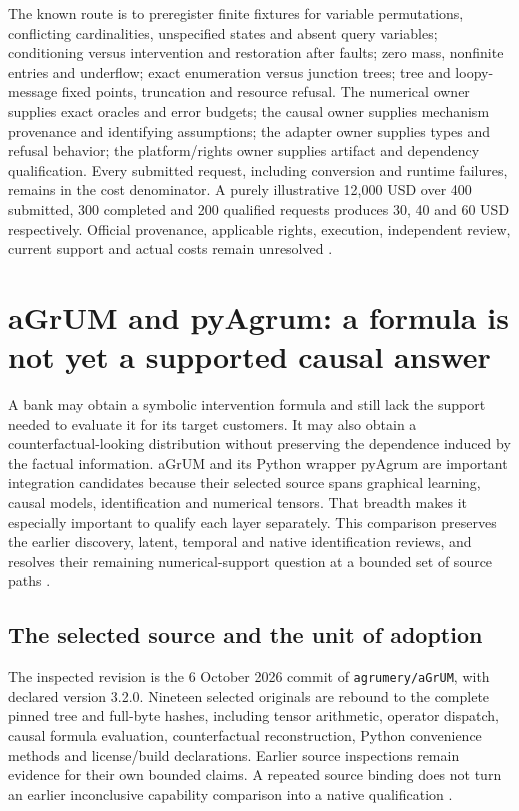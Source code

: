The known route is to preregister finite fixtures for variable permutations,
conflicting cardinalities, unspecified states and absent query variables;
conditioning versus intervention and restoration after faults; zero mass,
nonfinite entries and underflow; exact enumeration versus junction trees;
tree and loopy-message fixed points, truncation and resource refusal.
The numerical owner supplies exact oracles and error budgets; the causal
owner supplies mechanism provenance and identifying assumptions; the
adapter owner supplies types and refusal behavior; the platform/rights owner
supplies artifact and dependency qualification. Every submitted request,
including conversion and runtime failures, remains in the cost denominator.
A purely illustrative 12,000 USD over 400 submitted, 300 completed and
200 qualified requests produces 30, 40 and 60 USD respectively.
Official provenance, applicable rights, execution, independent review, current support and actual costs remain unresolved \cite{exec24_libdai_choice}.


\section{aGrUM and pyAgrum: a formula is not yet a supported causal answer}
\label{sec:exec24-agrum-reuse}

A bank may obtain a symbolic intervention formula and still lack the support
needed to evaluate it for its target customers. It may also obtain a
counterfactual-looking distribution without preserving the dependence induced
by the factual information. aGrUM and its Python wrapper pyAgrum are important
integration candidates because their selected source spans graphical
learning, causal models, identification and numerical tensors. That breadth
makes it especially important to qualify each layer separately. This
comparison preserves the earlier discovery, latent, temporal and native
identification reviews, and resolves their remaining numerical-support
question at a bounded set of source paths
\cite{exec13_cxx_agrum,exec14_native_agrum,exec16_ct_agrum,
exec19_cxx_identification_source,exec24_agrum_source}.

\subsection{The selected source and the unit of adoption}
The inspected revision is the 6 October 2026 commit of
\texttt{agrumery/aGrUM}, with declared version 3.2.0. Nineteen selected
originals are rebound to the complete pinned tree and full-byte hashes,
including tensor arithmetic, operator dispatch, causal formula evaluation,
counterfactual reconstruction, Python convenience methods and license/build
declarations. Earlier source inspections remain evidence for their own
bounded claims. A repeated source binding does not turn an earlier
inconclusive capability comparison into a native qualification
\cite{exec24_agrum_source,exec24_agrum_choice}.


